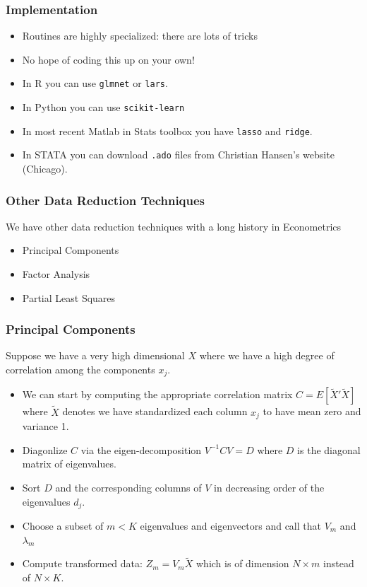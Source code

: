 \documentclass[xcolor=pdftex,dvipsnames,table,mathserif,aspectratio=169]{beamer}
\begin{document}
\begin{frame}
\frametitle{Implementation}
\begin{itemize}
\item Routines are highly specialized: there are lots of tricks
\item No hope of coding this up on your own!
\item In R you can use \texttt{glmnet} or \texttt{lars}.
\item In Python you can use \texttt{scikit-learn}
\item In most recent Matlab in Stats toolbox you have \texttt{lasso} and \texttt{ridge}.
\item In STATA you can download \texttt{.ado} files from Christian Hansen's website (Chicago).
\end{itemize}
\end{frame}

\begin{frame}
\frametitle{Other Data Reduction Techniques}
We have other data reduction techniques with a long history in Econometrics
\begin{itemize}
\item Principal Components
\item Factor Analysis
\item Partial Least Squares
\end{itemize}
\end{frame}

\begin{frame}
\frametitle{Principal Components}
Suppose we have a very high dimensional $X$ where we have a high degree of correlation among the components $x_j$. 
\begin{itemize}
\item We can start by computing the appropriate correlation matrix $C=E[\tilde{X}'\tilde{X}]$ where $\tilde{X}$ denotes we have standardized each column $x_j$ to have mean zero and variance 1.
\item Diagonlize $C$ via the eigen-decomposition $V^{-1} C V = D$ where $D$ is the diagonal matrix of eigenvalues.
\item Sort $D$ and the corresponding columns of $V$ in decreasing order of the eigenvalues $d_j$.
\item Choose a subset of $m < K$ eigenvalues and eigenvectors and call that $V_m$ and $\lambda_m$
\item Compute transformed data: $Z_m = V_m \tilde{X}$ which is of dimension $N \times m$ instead of $N \times K$.
\end{itemize}
\end{frame}
\end{document}
